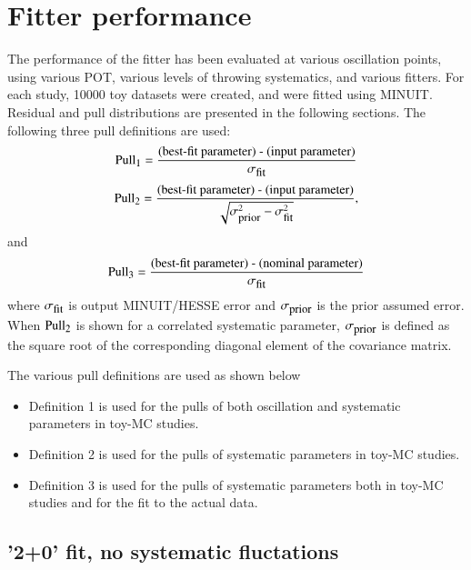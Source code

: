 \clearpage

\section{Fitter performance}
\label{sec:appendix:fitter_performance}

The performance of the fitter has been evaluated at various oscillation points, using various POT, various levels of throwing systematics, and various fitters.
For each study, 10000 toy datasets were created, and were fitted using MINUIT.
Residual and pull distributions are presented in the following sections.
The following three pull definitions are used:
\begin{equation}
\textrm{Pull}_{\textrm{\footnotesize{1}}} = \frac{\textrm{(best-fit parameter) - (input parameter)}}{\sigma_{\textrm{\small{fit}}}}
\end{equation}
\begin{equation}
\textrm{Pull}_{\textrm{\footnotesize{2}}} = \frac{\textrm{(best-fit parameter) - (input parameter)}}
{\sqrt{\sigma_{\textrm{\small{prior}}}^{2} - \sigma_{\textrm{\small{fit}}}^{2}}},
\end{equation}
and
\begin{equation}
\textrm{Pull}_{\textrm{\footnotesize{3}}} = \frac{\textrm{(best-fit parameter) - (nominal parameter)}}{\sigma_{\textrm{\small{fit}}}}
\end{equation}
where 
$\sigma_{\textrm{\small{fit}}}$ is output MINUIT/HESSE error and
$\sigma_{\textrm{\small{prior}}}$ is the prior assumed error.
When $\textrm{Pull}_{\textrm{\footnotesize{2}}}$ is shown for a correlated systematic parameter, 
$\sigma_{\textrm{\small{prior}}}$ is defined as the square root of the corresponding diagonal element of the covariance matrix.

The various pull definitions are used as shown below

\begin{itemize}
\item
Definition 1 is used for the pulls of both oscillation and systematic parameters in toy-MC studies.
\item
Definition 2 is used for the pulls of systematic parameters in toy-MC studies.
\item
Definition 3 is used for the pulls of systematic parameters both in toy-MC studies and for the fit to the actual data.
\end{itemize}

\clearpage
\subsection{'2+0' fit, no systematic fluctations}

